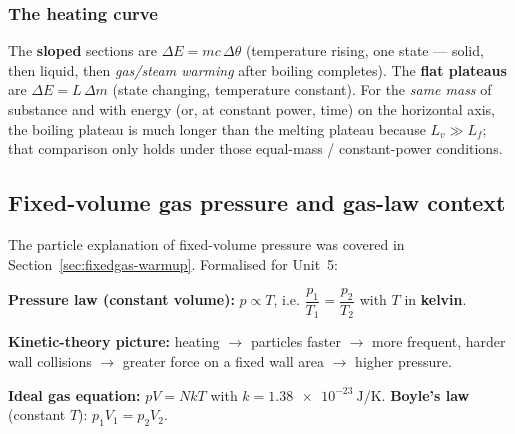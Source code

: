 \documentclass[11pt,a4paper]{article}
\newcommand{\dtheta}{\Delta\theta}
\newcommand{\dE}{\Delta E}
\begin{document}
\subsubsection{The heating curve}
\begin{center}
\end{center}
The \textbf{sloped} sections are $\dE = mc\,\dtheta$ (temperature rising, one state ---
solid, then liquid, then \emph{gas/steam warming} after boiling completes). The
\textbf{flat plateaus} are $\dE = L\,\Delta m$ (state changing, temperature constant). For
the \emph{same mass} of substance and with energy (or, at constant power, time) on the
horizontal axis, the boiling plateau is much longer than the melting plateau because
$L_v \gg L_f$; that comparison only holds under those equal-mass / constant-power
conditions.

\subsection{Fixed-volume gas pressure and gas-law context}

The particle explanation of fixed-volume pressure was covered in
Section~\ref{sec:fixedgas-warmup}. Formalised for Unit~5:

\begin{keybox}
\textbf{Pressure law (constant volume):} $p \propto T$, i.e.
$\dfrac{p_1}{T_1} = \dfrac{p_2}{T_2}$ with $T$ in \textbf{kelvin}.

\smallskip
\textbf{Kinetic-theory picture:} heating $\to$ particles faster $\to$ more frequent, harder
wall collisions $\to$ greater force on a fixed wall area $\to$ higher pressure.

\smallskip
\textbf{Ideal gas equation:} $pV = NkT$ with $k = \SI{1.38e-23}{\joule\per\kelvin}$.
\textbf{Boyle's law} (constant $T$): $p_1V_1 = p_2V_2$.
\end{keybox}
\end{document}
